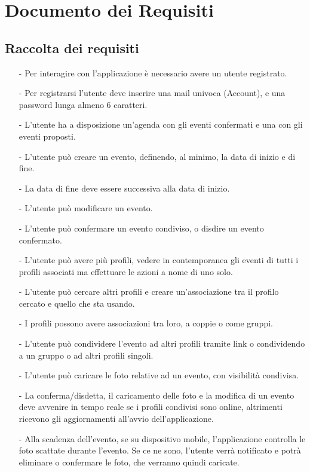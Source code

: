\newpage
\section{Documento dei Requisiti}

\subsection{Raccolta dei requisiti}

\begin{itemize}
  \item[-] Per interagire con l’applicazione è necessario avere un utente registrato.
  \item[-] Per registrarsi l’utente deve inserire una mail univoca (Account), e una password lunga almeno 6 caratteri.
  \item[-] L’utente ha a disposizione un’agenda con gli eventi confermati e una con gli eventi proposti.
  \item[-] L’utente può creare un evento, definendo, al minimo, la data di inizio e di fine.
  \item[-] La data di fine deve essere successiva alla data di inizio.
  \item[-] L’utente può modificare un evento.
  \item[-] L’utente può confermare un evento condiviso, o disdire un evento confermato.
  \item[-] L’utente può avere più profili, vedere in contemporanea gli eventi di tutti i profili associati ma effettuare le azioni a nome di uno solo.
  \item[-] L’utente può cercare altri profili e creare un’associazione tra il profilo cercato e quello che sta usando.
  \item[-] I profili possono avere associazioni tra loro, a coppie o come gruppi.
  \item[-] L’utente può condividere l’evento ad altri profili tramite link o condividendo a un gruppo o ad altri profili singoli.
  \item[-] L’utente può caricare le foto relative ad un evento, con visibilità condivisa.
  \item[-] La conferma/disdetta, il caricamento delle foto e la modifica di un evento deve avvenire in tempo reale se i profili condivisi sono online, altrimenti ricevono gli aggiornamenti all’avvio dell’applicazione.
  \item[-] Alla scadenza dell’evento, se su dispositivo mobile, l’applicazione controlla le foto scattate durante l’evento. Se ce ne sono, l’utente verrà notificato e potrà eliminare o confermare le foto, che verranno quindi caricate.
\end{itemize}

